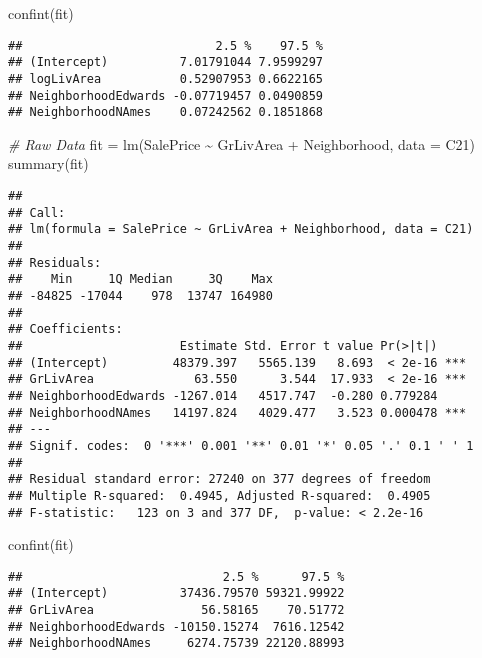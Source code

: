 \documentclass[
]{article}
\newenvironment{Shaded}{\begin{snugshade}}{\end{snugshade}}
\newcommand{\AttributeTok}[1]{\textcolor[rgb]{0.77,0.63,0.00}{#1}}
\newcommand{\CommentTok}[1]{\textcolor[rgb]{0.56,0.35,0.01}{\textit{#1}}}
\newcommand{\FunctionTok}[1]{\textcolor[rgb]{0.00,0.00,0.00}{#1}}
\newcommand{\NormalTok}[1]{#1}
\newcommand{\OtherTok}[1]{\textcolor[rgb]{0.56,0.35,0.01}{#1}}
\newcommand{\SpecialCharTok}[1]{\textcolor[rgb]{0.00,0.00,0.00}{#1}}
\begin{document}
\begin{Shaded}
\begin{Highlighting}[]
\FunctionTok{confint}\NormalTok{(fit)}
\end{Highlighting}
\end{Shaded}

\begin{verbatim}
##                           2.5 %    97.5 %
## (Intercept)          7.01791044 7.9599297
## logLivArea           0.52907953 0.6622165
## NeighborhoodEdwards -0.07719457 0.0490859
## NeighborhoodNAmes    0.07242562 0.1851868
\end{verbatim}

\begin{Shaded}
\begin{Highlighting}[]
\CommentTok{\# Raw Data}
\NormalTok{fit }\OtherTok{=} \FunctionTok{lm}\NormalTok{(SalePrice }\SpecialCharTok{\textasciitilde{}}\NormalTok{ GrLivArea }\SpecialCharTok{+}\NormalTok{ Neighborhood, }\AttributeTok{data =}\NormalTok{ C21)}
\FunctionTok{summary}\NormalTok{(fit)}
\end{Highlighting}
\end{Shaded}

\begin{verbatim}
## 
## Call:
## lm(formula = SalePrice ~ GrLivArea + Neighborhood, data = C21)
## 
## Residuals:
##    Min     1Q Median     3Q    Max 
## -84825 -17044    978  13747 164980 
## 
## Coefficients:
##                      Estimate Std. Error t value Pr(>|t|)    
## (Intercept)         48379.397   5565.139   8.693  < 2e-16 ***
## GrLivArea              63.550      3.544  17.933  < 2e-16 ***
## NeighborhoodEdwards -1267.014   4517.747  -0.280 0.779284    
## NeighborhoodNAmes   14197.824   4029.477   3.523 0.000478 ***
## ---
## Signif. codes:  0 '***' 0.001 '**' 0.01 '*' 0.05 '.' 0.1 ' ' 1
## 
## Residual standard error: 27240 on 377 degrees of freedom
## Multiple R-squared:  0.4945, Adjusted R-squared:  0.4905 
## F-statistic:   123 on 3 and 377 DF,  p-value: < 2.2e-16
\end{verbatim}

\begin{Shaded}
\begin{Highlighting}[]
\FunctionTok{confint}\NormalTok{(fit)}
\end{Highlighting}
\end{Shaded}

\begin{verbatim}
##                            2.5 %      97.5 %
## (Intercept)          37436.79570 59321.99922
## GrLivArea               56.58165    70.51772
## NeighborhoodEdwards -10150.15274  7616.12542
## NeighborhoodNAmes     6274.75739 22120.88993
\end{verbatim}
\end{document}
